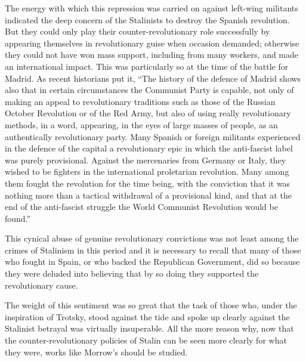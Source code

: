 The energy with which this repression was carried on against left-wing militants indicated the deep concern of the Stalinists to destroy the Spanish revolution. But they could only play their counter-revolutionary role successfully by appearing themselves in revolutionary guise when occasion demanded; otherwise they could not have won mass support, including from many workers, and made an international impact. This was particularly so at the time of the battle for Madrid. As recent historians put it, ``The history of the defence of Madrid shows also that in certain circumstances the Communist Party is capable, not only of making an appeal to revolutionary traditions such as those of the Russian October Revolution or of the Red Army, but also of using really revolutionary methods, in a word, appearing, in the eyes of large masses of people, as an authentically revolutionary party. Many Spanish or foreign militants experienced in the defence of the capital a revolutionary epic in which the anti-fascist label was purely provisional. Against the mercenaries from Germany or Italy, they wished to be fighters in the international proletarian revolution. Many among them fought the revolution for the time being, with the conviction that it was nothing more than a tactical withdrawal of a provisional kind, and that at the end of the anti-fascist struggle the World Communist Revolution would be found.''

This cynical abuse of genuine revolutionary convictions was not least among the crimes of Stalinism in this period and it is necessary to recall that many of those who fought in Spain, or who backed the Republican Government, did so because they were deluded into believing that by so doing they supported the revolutionary cause.

The weight of this sentiment was so great that the task of those who, under the inspiration of Trotsky, stood against the tide and spoke up clearly against the Stalinist betrayal was virtually insuperable. All the more reason why, now that the counter-revolutionary policies of Stalin can be seen more clearly for what they were, works like Morrow’s should be studied.

